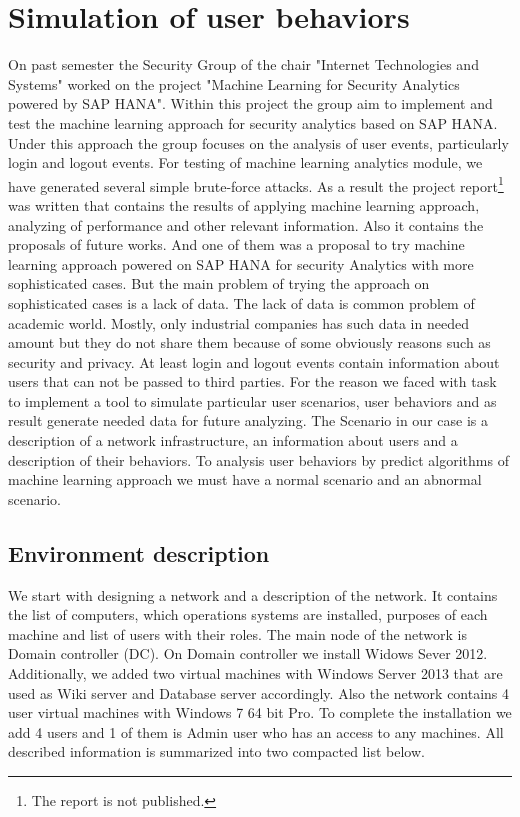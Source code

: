 \section{Simulation of user behaviors}
On past semester the Security Group of the chair "Internet Technologies and Systems" worked on the project "Machine Learning for Security Analytics powered by SAP HANA". Within this project the group aim to implement and test the machine learning approach for security analytics based on SAP HANA. Under this approach the group focuses on the analysis of user events, particularly login and logout events. For testing of machine learning analytics module, we have generated several simple brute-force attacks. As a result the project report\footnote{The report is not published.} was written that contains the results of applying machine learning approach, analyzing of performance and other relevant information. Also it contains the proposals of future works. And one of them was a proposal to try machine learning approach powered on SAP HANA for security Analytics with more sophisticated cases. But the main problem of trying the approach on sophisticated cases is a lack of data. The lack of data is common problem of academic world. Mostly, only industrial companies has such data in needed amount but they do not share them because of some obviously reasons such as security and privacy. At least login and logout events contain information about users that can not be passed to third parties. For the reason we faced with task to implement a tool to simulate particular user scenarios, user behaviors and as result generate needed data for future analyzing. 
The Scenario in our case is a description of a network infrastructure, an information about users and a description of their behaviors. To analysis user behaviors by predict algorithms of machine learning approach we must have a normal scenario and an abnormal scenario.  
  
\subsection{Environment description}
We start with designing a network and a description of the network. It contains the list of computers, which operations systems are installed, purposes of each machine and list of users with their roles. The main node of the network is Domain controller (DC). On Domain controller we install Widows Sever 2012. Additionally, we added two virtual machines with Windows Server 2013 that are used as Wiki server and Database server accordingly. Also the network contains 4 user virtual machines with Windows 7 64 bit Pro. To complete the installation we add 4 users and 1 of them is Admin user who has an access to any machines. All described information is summarized into two compacted list below. 

